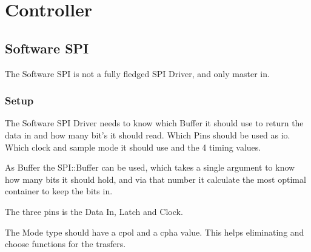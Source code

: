 \section{Controller}

\subsection{Software SPI}

The Software SPI is not a fully fledged SPI Driver, and only master in.

\subsubsection{Setup}

The Software SPI Driver needs to know which Buffer it should use to return the data in and how many bit's it should read. Which Pins should be used as io. Which clock and sample mode it should use and the 4 timing values.

As Buffer the SPI::Buffer can be used, which takes a single argument to know how many bits it should hold, and via that number it calculate the most optimal container to keep the bits in.

The three pins is the Data In, Latch and Clock.

The Mode type should have a cpol and a cpha value. This helps eliminating and choose functions for the trasfers.
